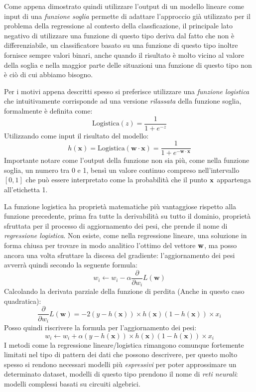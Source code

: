 \documentclass[../../main.tex]{subfiles}
\begin{document}
    Come appena dimostrato quindi utilizzare l'output di un modello lineare come input di una \textit{funzione soglia} permette di adattare l'approccio già utilizzato per il problema della regressione al contesto della classficazione, il principale lato negativo di utilizzare una funzione di questo tipo deriva dal fatto che non è differenziabile, un classificatore basato su una funzione di questo tipo inoltre fornisce sempre valori binari, anche quando il risultato è molto vicino al valore della soglia e nella maggior parte delle situazioni una funzione di questo tipo non è ciò di cui abbiamo bisogno.

    Per i motivi appena descritti spesso si preferisce utilizzare una \textit{funzione logistica} che intuitivamente corrisponde ad una versione \textit{rilassata} della funzione soglia, formalmente è definita come:
    \[ \text{Logistica}(z) = \frac{1}{1 + e^{-z}}\]
    Utilizzando come input il risultato del modello:
    \[h(\boldsymbol{x}) = \text{Logistica}(\boldsymbol{w} \cdot \boldsymbol{x}) = \frac{1}{1 + e^{- \boldsymbol{w \cdot x}}}\]
    Importante notare come l'output della funzione non sia più, come nella funzione soglia, un numero tra 0 e 1, bensì un valore continuo compreso nell'intervallo $[0, 1]$ che può essere interpretato come la probabilità che il punto $\bf{x}$ appartenga all'etichetta 1.

    La funzione logistica ha proprietà matematiche più vantaggiose rispetto alla funzione precedente, prima fra tutte la derivabilità su tutto il dominio, proprietà sfruttata per il processo di aggiornamento dei pesi, che prende il nome di \textit{regressione logistica}. Non esiste, come nella regressione lineare, una soluzione in forma chiusa per trovare in modo analitico l'ottimo del vettore $\bf{w}$, ma posso ancora una volta sfruttare la discesa del gradiente: l'aggiornamento dei pesi avverrà quindi secondo la seguente formula:
    \[w_i \leftarrow w_i - \alpha \frac{\partial}{\partial w_i} L(\boldsymbol{w})\]
    Calcolando la derivata parziale della funzione di perdita (Anche in questo caso quadratica):
    \[\frac{\partial}{\partial w_i} L(\boldsymbol{w}) = -2 (y - h(\boldsymbol{x})) \times h(\boldsymbol{x})(1 - h(\boldsymbol{x})) \times x_i\]
    Posso quindi riscrivere la formula per l'aggiornamento dei pesi:
    \begin{equation}
        w_i \leftarrow w_i + \alpha (y - h(\boldsymbol{x})) \times h(\boldsymbol{x})(1 - h(\boldsymbol{x})) \times x_i
    \end{equation}
    I metodi come la regressione lineare/logistica rimangono comunque fortemente limitati nel tipo di pattern dei dati che possono descrivere, per questo molto spesso si rendono necessari modelli più \textit{espressivi} per  poter approssimare un determinato dataset, modelli di questo tipo prendono il nome di \textit{reti neurali}: modelli complessi basati su circuiti algebrici.
\end{document}

